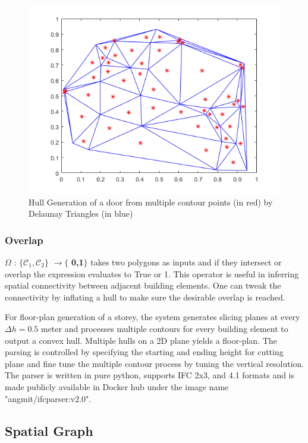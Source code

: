\documentclass[conference]{IEEEtran}
\begin{document}

\begin{figure}[]
\centering
  \includegraphics[width=0.5\linewidth]{img/triangulation.png}
  \caption{Hull Generation of a door from multiple contour points (in red) by Delaunay Triangles (in blue) }
  \label{fig:triangulation}
\end{figure}


\subsubsection{Overlap}

{$\Omega$} : $\{\mathcal{C}_1, \mathcal{C}_2 \}$  $\rightarrow \{$ \textbf{0,1}$ \}$  takes two polygons as inputs and if they intersect or overlap the expression evaluates to True or 1. This operator is useful in inferring spatial connectivity between adjacent building elements. One can tweak the connectivity by inflating a hull to make sure the desirable overlap is reached.


For floor-plan generation of a storey, the system generates slicing planes at every $\Delta h = 0.5$ meter and processes multiple contours for every building element to output a convex hull. Multiple hulls on a 2D plane yields a floor-plan. The parsing is controlled by specifying the starting and ending height for cutting plane and fine tune the multiple contour process by tuning the vertical resolution. The parser is written in pure python, supports IFC 2x3, and 4.1 formats and is made publicly available in Docker hub under the image name "angmit/ifcparser:v2.0".


\subsection{Spatial Graph}
\end{document}
